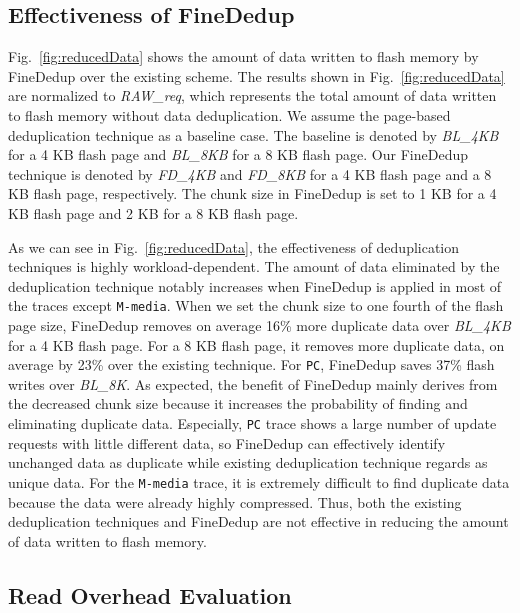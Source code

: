 \subsection{Effectiveness of FineDedup}

Fig.~\ref{fig:reducedData} shows the amount of data written to flash memory by FineDedup over the existing scheme.
The results shown in Fig.~\ref{fig:reducedData} are normalized to \textit{RAW\_req},
which represents the total amount of data written to flash memory without data deduplication.
We assume the page-based deduplication technique as a baseline case.
The baseline is denoted by \textit{BL\_4KB} for a 4 KB flash page and \textit{BL\_8KB} for a 8 KB flash page.
Our FineDedup technique is denoted by \textit{FD\_4KB} and \textit{FD\_8KB} for a 4 KB flash page and 
a 8 KB flash page, respectively.
The chunk size in FineDedup is set to 1 KB for a 4 KB flash page and 2 KB for a 8 KB flash page.

As we can see in Fig.~\ref{fig:reducedData}, 
the effectiveness of deduplication techniques is highly workload-dependent. 
The amount of data eliminated by the deduplication technique notably increases 
when FineDedup is applied in most of the traces except \texttt{M-media}.
When we set the chunk size to one fourth of the flash page size, 
FineDedup removes on average 16\% more duplicate data 
over \textit{BL\_4KB} for a 4 KB flash page.
For a 8 KB flash page, 
it removes more duplicate data, on average by 23\% over the existing technique.
For \texttt{PC}, FineDedup saves 37\% flash writes over \textit{BL\_8K}.
As expected, the benefit of FineDedup mainly derives from the decreased chunk size 
because it increases the probability of finding and eliminating duplicate data.
Especially, \texttt{PC} trace shows a large number of update requests with little different data, so FineDedup can effectively 
identify unchanged data as duplicate while existing deduplication technique regards as unique data.
For the \texttt{M-media} trace, 
it is extremely difficult to find duplicate data because the data were already highly compressed.
Thus, both the existing deduplication techniques and FineDedup are not effective in reducing the 
amount of data written to flash memory.

\subsection{Read Overhead Evaluation}

